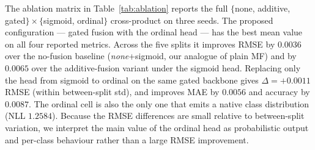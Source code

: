 \documentclass{article} %
\begin{document}
The ablation matrix in Table~\ref{tab:ablation} reports the full
$\{$none, additive, gated$\}\times\{$sigmoid, ordinal$\}$ cross-product on
three seeds. The proposed configuration --- gated fusion with the ordinal head --- has the
best mean value on all four reported metrics. Across the five
splits it improves RMSE by $0.0036$ over the no-fusion baseline
(\emph{none}+sigmoid, our analogue of plain MF) and by $0.0065$ over the
additive-fusion variant under the sigmoid head. Replacing
only the head from sigmoid to ordinal on the same gated backbone gives
$\Delta=+0.0011$ RMSE (within between-split std), and improves MAE by
$0.0056$ and accuracy by $0.0087$. The ordinal cell is also the only one
that emits a native class distribution (NLL $1.2584$).
Because the RMSE differences are small relative to between-split variation, we
interpret the main value of the ordinal head as probabilistic output and
per-class behaviour rather than a large RMSE improvement.

\begin{table}[ht]
\centering
\caption{Ablation matrix on MovieLens-100K, mean $\pm$ std across the five
canonical splits \texttt{u1}--\texttt{u5} (each split-mean averages three
seeds). Bold = best per column. Lower is better for RMSE/MAE/NLL, higher for
Accuracy.}
\label{tab:ablation}
\end{table}
\end{document}

